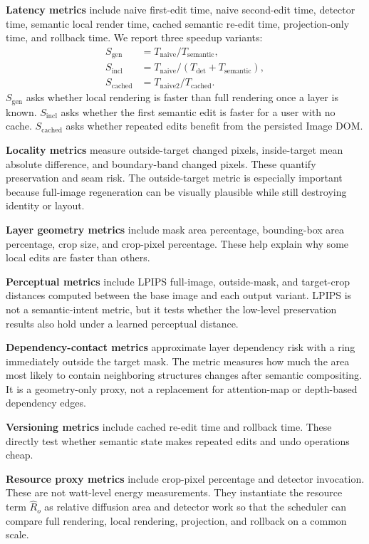 \documentclass[final,5p,times,number,sort&compress]{elsarticle}
\newcommand{\imageDOM}{Image DOM}
\begin{document}
\textbf{Latency metrics} include naive first-edit time, naive second-edit time, detector time, semantic local render time, cached semantic re-edit time, projection-only time, and rollback time. We report three speedup variants:
\begin{align}
    S_{\mathrm{gen}} &= T_{\mathrm{naive}} / T_{\mathrm{semantic}}, \\
    S_{\mathrm{incl}} &= T_{\mathrm{naive}} / (T_{\mathrm{det}} + T_{\mathrm{semantic}}), \\
    S_{\mathrm{cached}} &= T_{\mathrm{naive2}} / T_{\mathrm{cached}}.
\end{align}
\(S_{\mathrm{gen}}\) asks whether local rendering is faster than full rendering once a layer is known. \(S_{\mathrm{incl}}\) asks whether the first semantic edit is faster for a user with no cache. \(S_{\mathrm{cached}}\) asks whether repeated edits benefit from the persisted \imageDOM{}.

\textbf{Locality metrics} measure outside-target changed pixels, inside-target mean absolute difference, and boundary-band changed pixels. These quantify preservation and seam risk. The outside-target metric is especially important because full-image regeneration can be visually plausible while still destroying identity or layout.

\textbf{Layer geometry metrics} include mask area percentage, bounding-box area percentage, crop size, and crop-pixel percentage. These help explain why some local edits are faster than others.

\textbf{Perceptual metrics} include LPIPS full-image, outside-mask, and target-crop distances computed between the base image and each output variant. LPIPS is not a semantic-intent metric, but it tests whether the low-level preservation results also hold under a learned perceptual distance.

\textbf{Dependency-contact metrics} approximate layer dependency risk with a ring immediately outside the target mask. The metric measures how much the area most likely to contain neighboring structures changes after semantic compositing. It is a geometry-only proxy, not a replacement for attention-map or depth-based dependency edges.

\textbf{Versioning metrics} include cached re-edit time and rollback time. These directly test whether semantic state makes repeated edits and undo operations cheap.

\textbf{Resource proxy metrics} include crop-pixel percentage and detector invocation. These are not watt-level energy measurements. They instantiate the resource term \(\widehat{R}_o\) as relative diffusion area and detector work so that the scheduler can compare full rendering, local rendering, projection, and rollback on a common scale.
\end{document}
